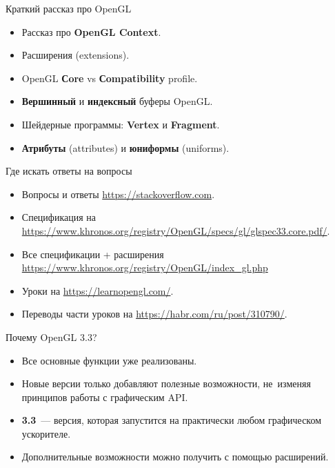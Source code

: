 \documentclass{beamer}
\begin{document}
\begin{frame}[fragile]{Краткий рассказ про OpenGL}
    \begin{itemize}
        \item Рассказ про {\bf OpenGL Context}.
        \item Расширения (extensions).
        \item OpenGL {\bf Сore} vs {\bf Сompatibility} profile.
        \item {\bf Вершинный} и {\bf индексный} буферы OpenGL.
        \item Шейдерные программы: {\bf Vertex} и {\bf Fragment}.
        \item {\bf Атрибуты} (attributes) и {\bf юниформы} (uniforms).
    \end{itemize}
\end{frame}

\begin{frame}[fragile]{Где искать ответы на вопросы}
    \begin{itemize}
        \item Вопросы и ответы \url{https://stackoverflow.com}.
        \item Спецификация на \\
            \url{https://www.khronos.org/registry/OpenGL/specs/gl/glspec33.core.pdf/}.
        \item Все спецификации + расширения \\
            \url{https://www.khronos.org/registry/OpenGL/index_gl.php}
        \item Уроки на \url{https://learnopengl.com/}.
        \item Переводы части уроков на \url{https://habr.com/ru/post/310790/}.
    \end{itemize}
\end{frame}

\begin{frame}[fragile]{Почему OpenGL 3.3?}
    \begin{itemize}
        \item Все основные функции уже реализованы.
        \item Новые версии только добавляют полезные возможности,
            не~изменяя принципов работы с графическим API.
        \item {\bf 3.3}~--- версия, которая запустится на практически 
            любом графическом ускорителе.
        \item Дополнительные возможности можно получить с помощью расширений.
    \end{itemize}
\end{frame}
\end{document}
